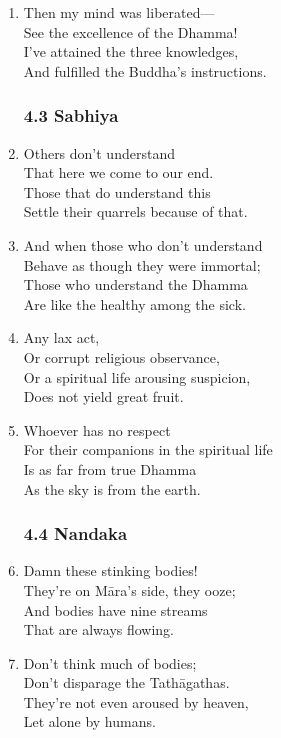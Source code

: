 \documentclass[10pt, openany]{book}
\begin{document}
\begin{enumerate}
\item Then my mind was liberated—\\
See the excellence of the Dhamma!\\
I’ve attained the three knowledges,\\
And fulfilled the Buddha’s instructions.

\subsubsection*{4.3 Sabhiya}

\item Others don’t understand\\
That here we come to our end.\\
Those that do understand this\\
Settle their quarrels because of that.

\item And when those who don’t understand\\
Behave as though they were immortal;\\
Those who understand the Dhamma\\
Are like the healthy among the sick.

\item Any lax act,\\
Or corrupt religious observance,\\
Or a spiritual life arousing suspicion,\\
Does not yield great fruit.

\item Whoever has no respect\\
For their companions in the spiritual life\\
Is as far from true Dhamma\\
As the sky is from the earth.

\subsubsection*{4.4 Nandaka}

\item Damn these stinking bodies!\\
They’re on Māra’s side, they ooze;\\
And bodies have nine streams\\
That are always flowing.

\item Don’t think much of bodies;\\
Don’t disparage the Tathāgathas.\\
They’re not even aroused by heaven,\\
Let alone by humans.


\end{enumerate}
\end{document}
